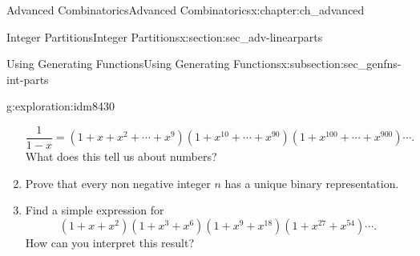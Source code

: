 \documentclass[oneside,10pt,]{book}
\numberwithin{equation}{chapter}
\begin{document}
\begin{chapterptx}{Advanced Combinatorics}{}{Advanced Combinatorics}{}{}{x:chapter:ch_advanced}
\begin{sectionptx}{Integer Partitions}{}{Integer Partitions}{}{}{x:section:sec_adv-linearparts}
\begin{subsectionptx}{Using Generating Functions}{}{Using Generating Functions}{}{}{x:subsection:sec_genfns-int-parts}
\begin{exploration}{}{g:exploration:idm8430}
\begin{enumerate}[font=\bfseries,label=(\alph*),ref=\alph*]
\begin{equation*}
\frac{1}{1-x} = (1 + x + x^2 +\cdots + x^9)(1 + x^{10} + \cdots + x^{90})(1 + x^{100} + \cdots + x^{900})\cdots.
\end{equation*}
What does this tell us about numbers?%
\item{}Prove that every non negative integer \(n\) has a unique binary representation.%
\item{}Find a simple expression for%
\begin{equation*}
(1+x+x^2)(1+x^3+x^6)(1+x^9+x^{18})(1+x^{27}+x^{54})\cdots.
\end{equation*}
How can you interpret this result?%
\end{enumerate}
\end{exploration}
\end{subsectionptx}
\end{sectionptx}
\end{chapterptx}
%
%
\typeout{************************************************}
\typeout{************************************************}
%
\end{document}
